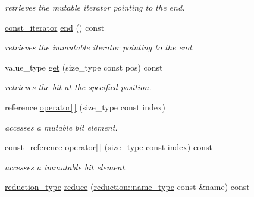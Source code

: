 \begin{DoxyCompactItemize}
\begin{DoxyCompactList}\small\item\em retrieves the mutable iterator pointing to the end. \end{DoxyCompactList}\item 
\hypertarget{classhryky_1_1_bitset_ab0cc44b3036eccc8f56c4322f14fc50e}{\hyperlink{classhryky_1_1iterator_1_1random_1_1_immutable}{const\-\_\-iterator} \hyperlink{classhryky_1_1_bitset_ab0cc44b3036eccc8f56c4322f14fc50e}{end} () const }\label{classhryky_1_1_bitset_ab0cc44b3036eccc8f56c4322f14fc50e}

\begin{DoxyCompactList}\small\item\em retrieves the immutable iterator pointing to the end. \end{DoxyCompactList}\item 
\hypertarget{classhryky_1_1_bitset_a35f36e917d8fe462a07d9a2b43d357a7}{value\-\_\-type \hyperlink{classhryky_1_1_bitset_a35f36e917d8fe462a07d9a2b43d357a7}{get} (size\-\_\-type const pos) const }\label{classhryky_1_1_bitset_a35f36e917d8fe462a07d9a2b43d357a7}

\begin{DoxyCompactList}\small\item\em retrieves the bit at the specified position. \end{DoxyCompactList}\item 
\hypertarget{classhryky_1_1_bitset_ae2c7a2634a3554fbbab8b16d60670d0d}{reference \hyperlink{classhryky_1_1_bitset_ae2c7a2634a3554fbbab8b16d60670d0d}{operator\mbox{[}$\,$\mbox{]}} (size\-\_\-type const index)}\label{classhryky_1_1_bitset_ae2c7a2634a3554fbbab8b16d60670d0d}

\begin{DoxyCompactList}\small\item\em accesses a mutable bit element. \end{DoxyCompactList}\item 
\hypertarget{classhryky_1_1_bitset_aef5ad56f7ce6cb0bcbb7906979cc1890}{const\-\_\-reference \hyperlink{classhryky_1_1_bitset_aef5ad56f7ce6cb0bcbb7906979cc1890}{operator\mbox{[}$\,$\mbox{]}} (size\-\_\-type const index) const }\label{classhryky_1_1_bitset_aef5ad56f7ce6cb0bcbb7906979cc1890}

\begin{DoxyCompactList}\small\item\em accesses a immutable bit element. \end{DoxyCompactList}\item 
\hypertarget{classhryky_1_1_bitset_a1fe0a2bac8a887580781ef3d073dc120}{\hyperlink{namespacehryky_a343a9a4c36a586be5c2693156200eadc}{reduction\-\_\-type} \hyperlink{classhryky_1_1_bitset_a1fe0a2bac8a887580781ef3d073dc120}{reduce} (\hyperlink{namespacehryky_1_1reduction_ac686c30a4c8d196bbd0f05629a6b921f}{reduction\-::name\-\_\-type} const \&name) const }\label{classhryky_1_1_bitset_a1fe0a2bac8a887580781ef3d073dc120}


\end{DoxyCompactItemize}
